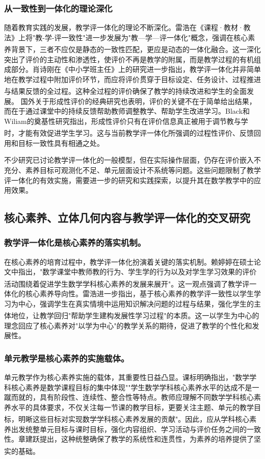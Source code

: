 \documentclass[UTF8,a4paper,12pt,twoside]{ctexart}
\begin{document}
\subsubsection{从一致性到一体化的理论深化}
随着教育实践的发展，教学评一体化的理论不断深化。雷浩在《课程·教材·教法》上将"教-学-评一致性"进一步发展为"教—学—评一体化"概念，强调在核心素养背景下，三者不应仅是静态的一致性匹配，更应是动态的一体化融合\textsuperscript{\cite{lei2023}}。这一深化突出了评价的主动性和渗透性，使评价不再是教学的附属，而是教学过程的有机组成部分。肖诗刚在《中小学班主任》上的研究进一步指出，教学评一体化并非简单地在教学过程中附加评价环节，而应将评价贯穿于目标设定、任务设计、过程推进与结果反馈的全过程\textsuperscript{\cite{xiao2025}}。这种全过程的评价确保了教学的持续改进和学生的全面发展。
国外关于形成性评价的经典研究也表明，评价的关键不在于简单给出结果，而在于通过课堂中的持续反馈帮助教师调整教学、帮助学生改进学习。Black和Wiliam的奠基性研究指出，形成性评价只有在评价信息真正被用于调节教与学时，才能有效促进学生学习\textsuperscript{\cite{Black}}。这与当前教学评一体化所强调的过程性评价、反馈回用和目标一致性具有相通之处。

不少研究已讨论教学评一体化的一般模型，但在实际操作层面，仍存在评价嵌入不充分、素养目标可观测化不足、单元层面设计不系统等问题。这些问题限制了教学评一体化的有效实施，需要进一步的研究和实践探索，以提升其在数学教学中的应用效果。

\subsection{核心素养、立体几何内容与教学评一体化的交叉研究}

\subsubsection{教学评一体化是核心素养的落实机制。}
在核心素养的培育过程中，教学评一体化扮演着关键的落实机制。赖婷婷在硕士论文中指出，"数学课堂中教师教的行为、学生学的行为以及对学生学习效果的评价活动围绕着促进学生数学学科核心素养的发展来展开"\textsuperscript{\cite{lai2024}}。这一观点强调了教学评一体化的核心素养导向性。雷浩进一步指出，基于核心素养的教学评一致性以学生学习为中心，强调学生在真实情境中运用知识解决问题的过程与结果，强化学生的主体地位，让教学回归"帮助学生建构发展性学习过程"的本质\textsuperscript{\cite{lei2023}}。这一以学生为中心的理念回应了核心素养对"以学为中心"的教学关系的期待，促进了教学的个性化和发展性。

\subsubsection{单元教学是核心素养的实施载体。}
单元教学作为核心素养实施的载体，其重要性日益凸显。课标明确指出，"数学学科核心素养是数学课程目标的集中体现""学生数学学科核心素养水平的达成不是一蹴而就的，具有阶段性、连续性、整合性等特点。教师应理解不同数学学科核心素养水平的具体要求，不仅关注每一节课的教学目标，更要关注主题、单元的教学目标，明晰这些目标对实现数学学科核心素养发展的贡献"\textsuperscript{\cite{gaozhong_kebiao2020}}。因此，应从学科核心素养出发统整单元目标与课时目标，强化内容组织、学习活动与评价任务之间的一致性。章建跃提出，这种统整确保了教学的系统性和连贯性，为素养的培养提供了坚实的基础\textsuperscript{\cite{zhang2020}}。
\end{document}
